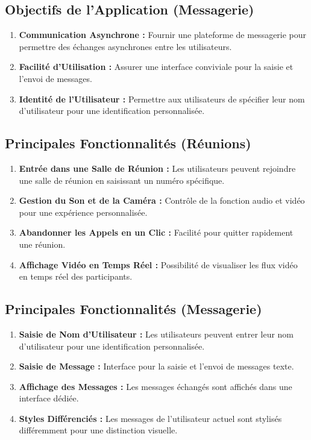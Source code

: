 \documentclass[12pt, a4paper, oneside]{Thesis}
\begin{document}
\subsection{Objectifs de l'Application (Messagerie)}
\begin{enumerate}
    \item \textbf{Communication Asynchrone :} Fournir une plateforme de messagerie pour permettre des échanges asynchrones entre les utilisateurs.
    \item \textbf{Facilité d'Utilisation :} Assurer une interface conviviale pour la saisie et l'envoi de messages.
    \item \textbf{Identité de l'Utilisateur :} Permettre aux utilisateurs de spécifier leur nom d'utilisateur pour une identification personnalisée.
\end{enumerate}

\subsection{Principales Fonctionnalités (Réunions)}
\begin{enumerate}
    \item \textbf{Entrée dans une Salle de Réunion :} Les utilisateurs peuvent rejoindre une salle de réunion en saisissant un numéro spécifique.
    \item \textbf{Gestion du Son et de la Caméra :} Contrôle de la fonction audio et vidéo pour une expérience personnalisée.
    \item \textbf{Abandonner les Appels en un Clic :} Facilité pour quitter rapidement une réunion.
    \item \textbf{Affichage Vidéo en Temps Réel :} Possibilité de visualiser les flux vidéo en temps réel des participants.
\end{enumerate}

\subsection{Principales Fonctionnalités (Messagerie)}
\begin{enumerate}
    \item \textbf{Saisie de Nom d'Utilisateur :} Les utilisateurs peuvent entrer leur nom d'utilisateur pour une identification personnalisée.
    \item \textbf{Saisie de Message :} Interface pour la saisie et l'envoi de messages texte.
    \item \textbf{Affichage des Messages :} Les messages échangés sont affichés dans une interface dédiée.
    \item \textbf{Styles Différenciés :} Les messages de l'utilisateur actuel sont stylisés différemment pour une distinction visuelle.
\end{enumerate}
\end{document}
